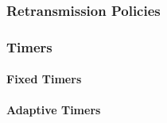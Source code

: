 \subsubsection{Retransmission Policies}\label{subsubsec:Retransmission_Policies}
\subsubsection{Timers}\label{subsubsec:Packet_Timers}
\paragraph{Fixed Timers}\label{par:Fixed_Packet_Timers}
\paragraph{Adaptive Timers}\label{par:Adaptive_Packet_Timers}
